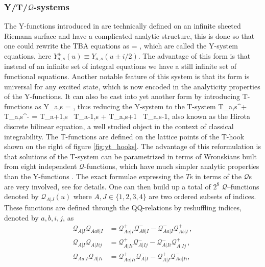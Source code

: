 \subsubsection{Y/T/$\mathcal{Q}$-systems}

The Y-functions introduced in  are technically defined on an infinite sheeted Riemann surface and have a complicated analytic structure, this is done so that one could rewrite the TBA equations as \cite{Gromov:2009bc, Cavaglia:2010nm}
\beq
	\label{eq:ysystem}
	 = ,
\eeq
which are called the Y-system equations, here $Y^\pm_{a,s}(u) \equiv Y_{a,s}(u \pm i/2)$.
The advantage of this form is that instead of an infinite set of integral equations we have a still infinite set of functional equations.
Another notable feature of this system is that its form is universal for any excited state, which is now encoded in the analyticity properties of the Y-functions. 
It can also be cast into yet another form by introducing T-functions as
\beq
	\label{eq:tyrelation}
	Y_{a,s} = ,
\eeq
thus reducing the Y-system to the T-system
\beq
	\label{eq:tsystem}
	T_{a,s}^+ \, T_{a,s}^- = T_{a+1,s} \, T_{a-1,s} + T_{a,s+1} \,  T_{a,s-1},
\eeq
also known as the Hirota discrete bilinear equation, a well studied object in the context of classical integrability.
The T-functions are defined on the lattice points of the T-hook shown on the right of figure \ref{fig:yt_hooks}.
The advantage of this reformulation is that solutions of the T-system can be parametrized in terms of Wronskians built from eight independent $\mathcal{Q}$-functions, which have much simpler analytic properties than the Y-functions \cite{Gromov:2010km}. 
The exact formulae expressing the $T$s in terms of the $\mathcal{Q}$s are very involved, see \cite{Gromov:2010km} for details.
One can then build up a total of $2^8$ $\mathcal{Q}$--functions denoted by $\mathcal{Q}_{A|J}(u)$ where $A,J \in \{1,2,3,4\}$ are two ordered subsets of indices.
These functions are defined through the QQ-relations by reshuffling indices, denoted by $a, b, i, j$, as
\begin{subequations}\label{definingQQ}
    \begin{align}
       \label{QQbb}
       \mathcal{Q}_{A|I}\mathcal{Q}_{A ab|I} &=\mathcal{Q}_{A a|I}^{+} \mathcal{Q}_{A b|I}^{-}-
       \mathcal{Q}_{A a|I}^{-}
       \mathcal{Q}_{A b|I}^{+}\,,\\
       \label{QQff}
       \mathcal{Q}_{A|I}\mathcal{Q}_{A|I ij} &=\mathcal{Q}_{A|I i}^{+} \mathcal{Q}_{A|I j}^{-}-
       \mathcal{Q}_{A|I i}^{-} \mathcal{Q}_{A|I j}^{+}\,,\\
       \label{QQbf}
       \mathcal{Q}_{A a|I}\mathcal{Q}_{A|I i} &= \mathcal{Q}_{A a|I i}^{+}\mathcal{Q}_{A|I}^{-}-
       \mathcal{Q}_{A|I}^{+} \mathcal{Q}_{A a|I i}^{-}, \,
     \end{align}
\end{subequations} 
